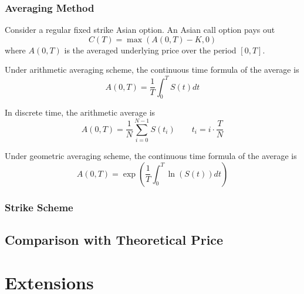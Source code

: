 \documentclass[a4paper,11pt] {article}
\begin{document}
\subsubsection{Averaging Method}
Consider a regular fixed strike Asian option. An Asian call option pays out
$$
C(T) = \max(A(0,T)-K,0)
$$
where $A(0,T)$ is the averaged underlying price over the period $[0,T]$.

Under arithmetic averaging scheme, the continuous time formula of the average is
$$
A(0,T) = \frac{1}{T} \int_0^T S(t)dt
$$

In discrete time, the arithmetic average is
$$
A(0,T) = \frac{1}{N} \sum_{i=0}^{N-1} S(t_i) \qquad t_i = i \cdot \frac{T}{N}
$$

Under geometric averaging scheme, the continuous time formula of the average is
$$
A(0,T) = \exp\left(\frac{1}{T} \int_0^T \ln(S(t))dt\right)
$$



\subsubsection{Strike Scheme}

\subsection{Comparison with Theoretical Price}

\section{Extensions}

%
\end{document}
